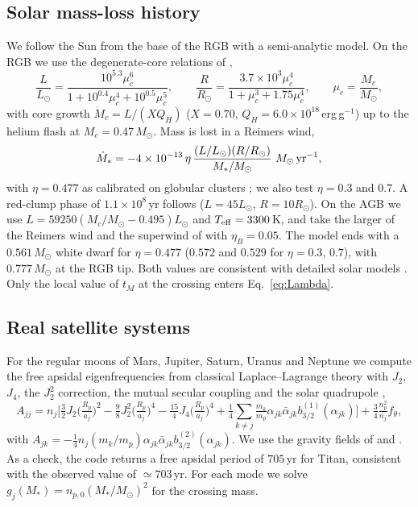 \documentclass[11pt,a4paper]{article}
\newcommand{\msun}{M_\odot}
\begin{document}
\subsection{Solar mass-loss history}

We follow the Sun from the base of the RGB with a semi-analytic model. On the RGB we use the degenerate-core relations of \citet{Rappaport1995},
\begin{equation}
\frac{L}{L_\odot}=\frac{10^{5.3}\mu_c^{6}}{1+10^{0.4}\mu_c^{4}+10^{0.5}\mu_c^{5}},\qquad \frac{R}{R_\odot}=\frac{3.7\times10^{3}\mu_c^{4}}{1+\mu_c^{3}+1.75\mu_c^{4}},\qquad \mu_c=\frac{M_c}{\msun},
\end{equation}
with core growth $\dot M_c=L/(XQ_H)$ ($X=0.70$, $Q_H=6.0\times10^{18}$\,erg\,g$^{-1}$) up to the helium flash at $M_c=0.47\,\msun$. Mass is lost in a Reimers wind,
\begin{equation}
\dot M_\ast=-4\times10^{-13}\,\eta\,\frac{(L/L_\odot)(R/R_\odot)}{M_\ast/\msun}\ \msun\,{\rm yr^{-1}},
\end{equation}
with $\eta=0.477$ as calibrated on globular clusters \citep{McDonald2015}; we also test $\eta=0.3$ and $0.7$. A red-clump phase of $1.1\times10^8$\,yr follows ($L=45L_\odot$, $R=10R_\odot$). On the AGB we use $L=59250(M_c/\msun-0.495)L_\odot$ \citep{Wood1981} and $T_{\rm eff}=3300$\,K, and take the larger of the Reimers wind and the superwind of \citet{Bloecker1995} with $\eta_B=0.05$. The model ends with a $0.561\,\msun$ white dwarf for $\eta=0.477$ ($0.572$ and $0.529$ for $\eta=0.3$, $0.7$), with $0.777\,\msun$ at the RGB tip. Both values are consistent with detailed solar models \citep{Schroder2008}. Only the local value of $t_M$ at the crossing enters Eq.~\eqref{eq:Lambda}.

\subsection{Real satellite systems}

For the regular moons of Mars, Jupiter, Saturn, Uranus and Neptune we compute the free apsidal eigenfrequencies from classical Laplace--Lagrange theory with $J_2$, $J_4$, the $J_2^2$ correction, the mutual secular coupling and the solar quadrupole \citep{MurrayDermott1999},
\begin{equation}
A_{jj}=n_j\Big[\tfrac32J_2\big(\tfrac{R_p}{a_j}\big)^2-\tfrac98J_2^2\big(\tfrac{R_p}{a_j}\big)^4-\tfrac{15}{4}J_4\big(\tfrac{R_p}{a_j}\big)^4+\tfrac14\sum_{k\ne j}\tfrac{m_k}{m_p}\alpha_{jk}\bar\alpha_{jk}b^{(1)}_{3/2}(\alpha_{jk})\Big]+\tfrac34\tfrac{n_p^2}{n_j}f_\theta,
\end{equation}
with $A_{jk}=-\tfrac14n_j(m_k/m_p)\alpha_{jk}\bar\alpha_{jk}b^{(2)}_{3/2}(\alpha_{jk})$. We use the gravity fields of \citet{Jacobson2006} and \citet{Iess2018}. As a check, the code returns a free apsidal period of $705$\,yr for Titan, consistent with the observed value of $\simeq703$\,yr. For each mode we solve $g_j(M_\ast)=n_{p,0}(M_\ast/\msun)^2$ for the crossing mass.
\end{document}
